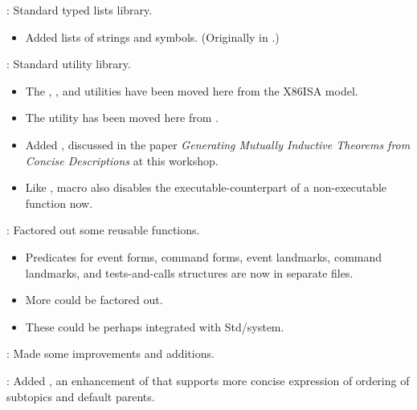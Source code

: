 
\begin{frame}

\implibtitle

:
Standard typed lists library.
\begin{itemize}
\item
Added lists of strings and symbols.
(Originally in .)
\end{itemize}

\separation

:
Standard utility library.
\begin{itemize}
\item
The
,
, and
utilities have been moved here from the X86ISA model.
\item
The  utility has been moved here
from .
\item Added , discussed in the paper \textit{Generating Mutually Inductive Theorems from Concise Descriptions} at this workshop.
\item
Like ,  macro also disables the executable-counterpart of a non-executable function now.
\end{itemize}

\end{frame}


\begin{frame}

\implibtitle

:
Factored out some reusable functions.
\begin{itemize}
\item
Predicates for
event forms,
command forms,
event landmarks,
command landmarks, and
tests-and-calls structures
are now in separate files.
\item
More could be factored out.
\item
These could be perhaps integrated with Std/system.
\end{itemize}

\separation

:
Made some improvements and additions.

\separation

:
Added , an enhancement of 
that supports more concise expression of
ordering of subtopics and default parents.

\end{frame}



